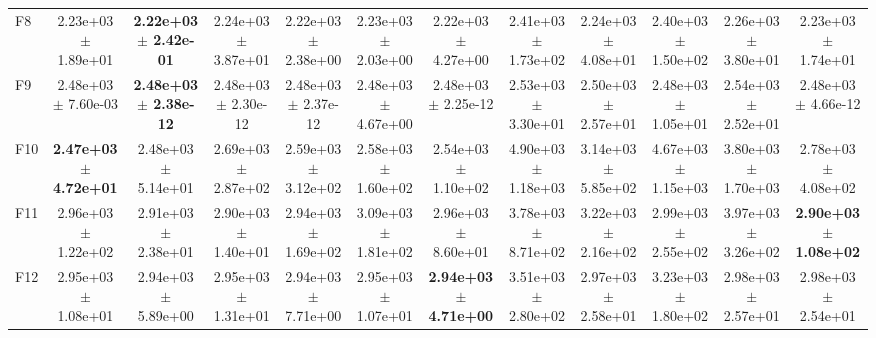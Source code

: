 \begin{table}
{\begin{tabular}{lccccccccccc}
F8 & 2.23e+03 $\pm$ 1.89e+01 & \textbf{2.22e+03 $\pm$ 2.42e-01} & 2.24e+03 $\pm$ 3.87e+01 & 2.22e+03 $\pm$ 2.38e+00 & 2.23e+03 $\pm$ 2.03e+00 & 2.22e+03 $\pm$ 4.27e+00 & 2.41e+03 $\pm$ 1.73e+02 & 2.24e+03 $\pm$ 4.08e+01 & 2.40e+03 $\pm$ 1.50e+02 & 2.26e+03 $\pm$ 3.80e+01 & 2.23e+03 $\pm$ 1.74e+01 \\
F9 & 2.48e+03 $\pm$ 7.60e-03 & \textbf{2.48e+03 $\pm$ 2.38e-12} & 2.48e+03 $\pm$ 2.30e-12 & 2.48e+03 $\pm$ 2.37e-12 & 2.48e+03 $\pm$ 4.67e+00 & 2.48e+03 $\pm$ 2.25e-12 & 2.53e+03 $\pm$ 3.30e+01 & 2.50e+03 $\pm$ 2.57e+01 & 2.48e+03 $\pm$ 1.05e+01 & 2.54e+03 $\pm$ 2.52e+01 & 2.48e+03 $\pm$ 4.66e-12 \\
F10 & \textbf{2.47e+03 $\pm$ 4.72e+01} & 2.48e+03 $\pm$ 5.14e+01 & 2.69e+03 $\pm$ 2.87e+02 & 2.59e+03 $\pm$ 3.12e+02 & 2.58e+03 $\pm$ 1.60e+02 & 2.54e+03 $\pm$ 1.10e+02 & 4.90e+03 $\pm$ 1.18e+03 & 3.14e+03 $\pm$ 5.85e+02 & 4.67e+03 $\pm$ 1.15e+03 & 3.80e+03 $\pm$ 1.70e+03 & 2.78e+03 $\pm$ 4.08e+02 \\
F11 & 2.96e+03 $\pm$ 1.22e+02 & 2.91e+03 $\pm$ 2.38e+01 & 2.90e+03 $\pm$ 1.40e+01 & 2.94e+03 $\pm$ 1.69e+02 & 3.09e+03 $\pm$ 1.81e+02 & 2.96e+03 $\pm$ 8.60e+01 & 3.78e+03 $\pm$ 8.71e+02 & 3.22e+03 $\pm$ 2.16e+02 & 2.99e+03 $\pm$ 2.55e+02 & 3.97e+03 $\pm$ 3.26e+02 & \textbf{2.90e+03 $\pm$ 1.08e+02} \\
F12 & 2.95e+03 $\pm$ 1.08e+01 & 2.94e+03 $\pm$ 5.89e+00 & 2.95e+03 $\pm$ 1.31e+01 & 2.94e+03 $\pm$ 7.71e+00 & 2.95e+03 $\pm$ 1.07e+01 & \textbf{2.94e+03 $\pm$ 4.71e+00} & 3.51e+03 $\pm$ 2.80e+02 & 2.97e+03 $\pm$ 2.58e+01 & 3.23e+03 $\pm$ 1.80e+02 & 2.98e+03 $\pm$ 2.57e+01 & 2.98e+03 $\pm$ 2.54e+01 \\
\bottomrule
\end{tabular}%
}
\end{table}
